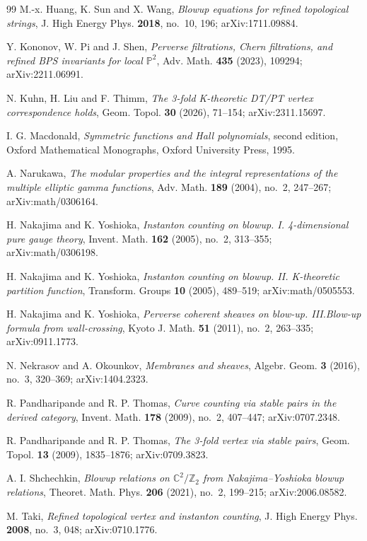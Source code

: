 \documentclass{amsart}
\theoremstyle{definition}
\numberwithin{equation}{section}
\begin{document}
\begin{thebibliography}{99}
 M.-x. Huang, K. Sun and X. Wang, \emph{Blowup equations for refined topological strings}, J. High Energy Phys. \textbf{2018}, no.~10, 196; arXiv:1711.09884.

 Y. Kononov, W. Pi and J. Shen, \emph{Perverse filtrations, Chern filtrations, and refined BPS invariants for local \(\mathbb P^2\)}, Adv. Math. \textbf{435} (2023), 109294; arXiv:2211.06991.

 N. Kuhn, H. Liu and F. Thimm, \emph{The 3-fold K-theoretic DT/PT vertex correspondence holds}, Geom. Topol. \textbf{30} (2026), 71--154; arXiv:2311.15697.

 I. G. Macdonald, \emph{Symmetric functions and Hall polynomials}, second edition, Oxford Mathematical Monographs, Oxford University Press, 1995.

 A. Narukawa, \emph{The modular properties and the integral representations of the multiple elliptic gamma functions}, Adv. Math. \textbf{189} (2004), no.~2, 247--267; arXiv:math/0306164.

 H. Nakajima and K. Yoshioka, \emph{Instanton counting on blowup. I. 4-dimensional pure gauge theory}, Invent. Math. \textbf{162} (2005), no.~2, 313--355; arXiv:math/0306198.

 H. Nakajima and K. Yoshioka, \emph{Instanton counting on blowup. II. K-theoretic partition function}, Transform. Groups \textbf{10} (2005), 489--519; arXiv:math/0505553.

 H. Nakajima and K. Yoshioka, \emph{Perverse coherent sheaves on blow-up. III.\@ Blow-up formula from wall-crossing}, Kyoto J. Math. \textbf{51} (2011), no.~2, 263--335; arXiv:0911.1773.

 N. Nekrasov and A. Okounkov, \emph{Membranes and sheaves}, Algebr. Geom. \textbf{3} (2016), no.~3, 320--369; arXiv:1404.2323.

 R. Pandharipande and R. P. Thomas, \emph{Curve counting via stable pairs in the derived category}, Invent. Math. \textbf{178} (2009), no.~2, 407--447; arXiv:0707.2348.

 R. Pandharipande and R. P. Thomas, \emph{The 3-fold vertex via stable pairs}, Geom. Topol. \textbf{13} (2009), 1835--1876; arXiv:0709.3823.

 A. I. Shchechkin, \emph{Blowup relations on \(\mathbb C^2/\mathbb Z_2\) from Nakajima--Yoshioka blowup relations}, Theoret. Math. Phys. \textbf{206} (2021), no.~2, 199--215; arXiv:2006.08582.

 M. Taki, \emph{Refined topological vertex and instanton counting}, J. High Energy Phys. \textbf{2008}, no.~3, 048; arXiv:0710.1776.

\end{thebibliography}
\end{document}
